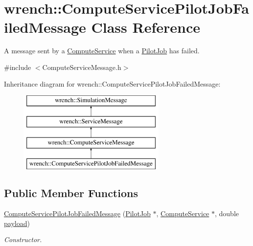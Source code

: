 \hypertarget{classwrench_1_1_compute_service_pilot_job_failed_message}{}\section{wrench\+:\+:Compute\+Service\+Pilot\+Job\+Failed\+Message Class Reference}
\label{classwrench_1_1_compute_service_pilot_job_failed_message}


A message sent by a \hyperlink{classwrench_1_1_compute_service}{Compute\+Service} when a \hyperlink{classwrench_1_1_pilot_job}{Pilot\+Job} has failed.  




{\ttfamily \#include $<$Compute\+Service\+Message.\+h$>$}

Inheritance diagram for wrench\+:\+:Compute\+Service\+Pilot\+Job\+Failed\+Message\+:\begin{figure}[H]
\begin{center}
\leavevmode
\includegraphics[height=4.000000cm]{classwrench_1_1_compute_service_pilot_job_failed_message}
\end{center}
\end{figure}
\subsection*{Public Member Functions}
\begin{DoxyCompactItemize}
\item 
\hyperlink{classwrench_1_1_compute_service_pilot_job_failed_message_ad3875966abe48e0875e385d7ece80e9f}{Compute\+Service\+Pilot\+Job\+Failed\+Message} (\hyperlink{classwrench_1_1_pilot_job}{Pilot\+Job} $\ast$, \hyperlink{classwrench_1_1_compute_service}{Compute\+Service} $\ast$, double \hyperlink{classwrench_1_1_simulation_message_a914f2732713f7c02898e66f05a7cb8a1}{payload})
\begin{DoxyCompactList}\small\item\em Constructor. \end{DoxyCompactList}\end{DoxyCompactItemize}
